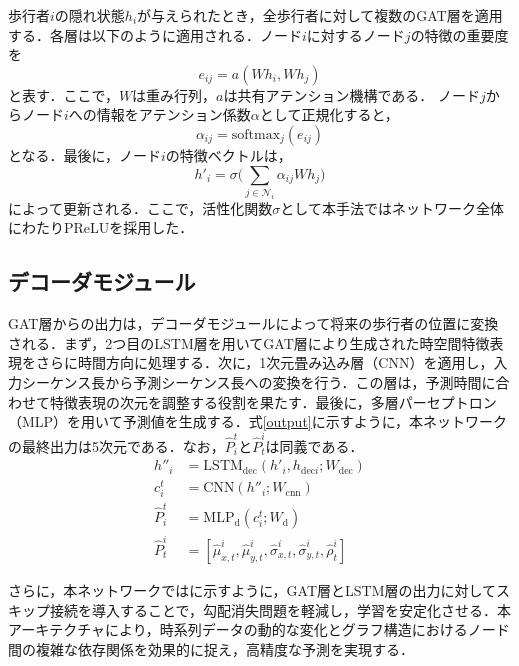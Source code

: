 歩行者$i$の隠れ状態$h_i$が与えられたとき，全歩行者に対して複数のGAT層を適用する．各層は以下のように適用される．ノード$i$に対するノード$j$の特徴の重要度を
\begin{equation}
  e_{ij} = a(Wh_i, Wh_j) \label{gat-eij}
\end{equation}
と表す．ここで，$W$は重み行列，$a$は共有アテンション機構である．
ノード$j$からノード$i$への情報をアテンション係数$\alpha$として正規化すると，
\begin{equation}
  \alpha_{ij} = \text{softmax}_{j}(e_{ij})
\end{equation}
となる．最後に，ノード$i$の特徴ベクトルは，
\begin{equation}
  h'_i = \sigma\Bigg(\sum_{j \in \mathcal{N}_i} \alpha_{ij}Wh_j \Bigg)
\end{equation}
によって更新される．ここで，活性化関数$\sigma$として本手法ではネットワーク全体にわたりPReLU\cite{he2015delving-prelu}を採用した．

\subsection{デコーダモジュール}\label{sec:decoder}
GAT層からの出力は，デコーダモジュールによって将来の歩行者の位置に変換される．まず，2つ目のLSTM層を用いてGAT層により生成された時空間特徴表現をさらに時間方向に処理する．次に，1次元畳み込み層（CNN）を適用し，入力シーケンス長から予測シーケンス長への変換を行う．この層は，予測時間に合わせて特徴表現の次元を調整する役割を果たす．最後に，多層パーセプトロン（MLP）を用いて予測値を生成する．式\eqref{output}に示すように，本ネットワークの最終出力は5次元である．なお，$\hat{P}^t_i\text{と}\hat{P}^i_t$は同義である．
\begin{align}
  h''_i &= \text{LSTM}_{\text{dec}}(h'_i, h_{\text{dec}i}; W_{\text{dec}})\\
  c^t_i &= \text{CNN}(h''_i; W_{\text{cnn}}) \\
  \hat{P}^t_i &= \text{MLP}_{\text{d}}(c^t_i; W_{\text{d}}) \\
  \hat{P}^i_t &= [\hat{\mu}^i_{x,t}, \hat{\mu}^i_{y, t}, \hat{\sigma}^i_{x, t}, \hat{\sigma}^i_{y, t}, \hat{\rho}^i_t] \label{output}
\end{align}

さらに，本ネットワークではに示すように，GAT層とLSTM層の出力に対してスキップ接続\cite{he2016deep-resnet}を導入することで，勾配消失問題\cite{hochreiter2001gradient-grad,weinleindiplomarbeit-grad, schmidhuber2015deep-grad}を軽減し，学習を安定化させる．本アーキテクチャにより，時系列データの動的な変化とグラフ構造におけるノード間の複雑な依存関係を効果的に捉え，高精度な予測を実現する．

